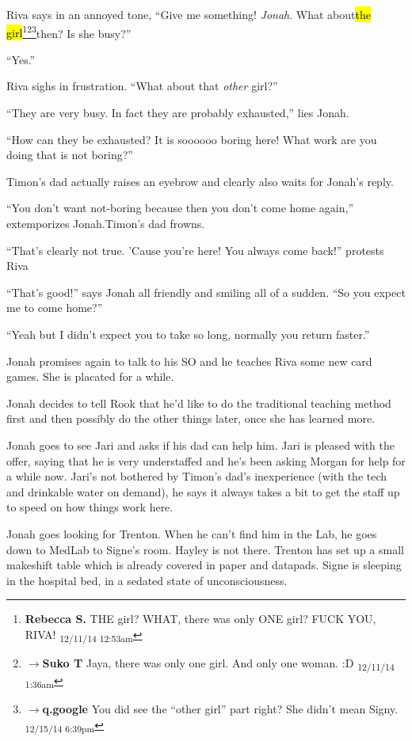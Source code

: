 Riva says in an annoyed tone, ``Give me something!  \textit{Jonah}.  What about\hl{the girl}\footnote{\textbf{Rebecca S. }THE girl?  WHAT, there was only ONE girl?  FUCK YOU, RIVA! \textsubscript{12/11/14 12:53am}}\footnote{$\rightarrow$\textbf{Suko T }Jaya, there was only one girl.  And only one woman. :D \textsubscript{12/11/14 1:36am}}\footnote{$\rightarrow$\textbf{q.google }You did see the ``other girl'' part right?  She didn't mean Signy. \textsubscript{12/15/14 6:39pm}}then?  Is she busy?''

``Yes.''

Riva sighs in frustration.  ``What about that \textit{other} girl?''

``They are very busy.  In fact they are probably exhausted,'' lies Jonah.

``How can they be exhausted?  It is soooooo boring here!  What work are you doing that is not boring?''

Timon's dad actually raises an eyebrow and clearly also waits for Jonah's reply.

``You don't want not-boring because then you don't come home again,'' extemporizes Jonah.Timon's dad frowns.

``That's clearly not true.  'Cause you're here!  You always come back!'' protests Riva

``That's good!'' says Jonah all friendly and smiling all of a sudden.  ``So you expect me to come home?''

``Yeah but I didn't expect you to take so long, normally you return faster.''

Jonah promises again to talk to his SO and he teaches Riva some new card games.  She is placated for a while.

Jonah decides to tell Rook that he'd like to do the traditional teaching method first and then possibly do the other things later, once she has learned more.



Jonah goes to see Jari and asks if his dad can help him. Jari is pleased with the offer, saying that he is very understaffed and he's been asking Morgan for help for a while now.  Jari's not bothered by Timon's dad's inexperience (with the tech and drinkable water on demand), he says it always takes a bit to get the staff up to speed on how things work here.



Jonah goes looking for Trenton. When he can't find him in the Lab, he goes down to MedLab to Signe's room.  Hayley is not there.   Trenton has set up a small makeshift table which is already covered in paper and datapads.  Signe is sleeping in the hospital bed, in a sedated state of unconsciousness.



